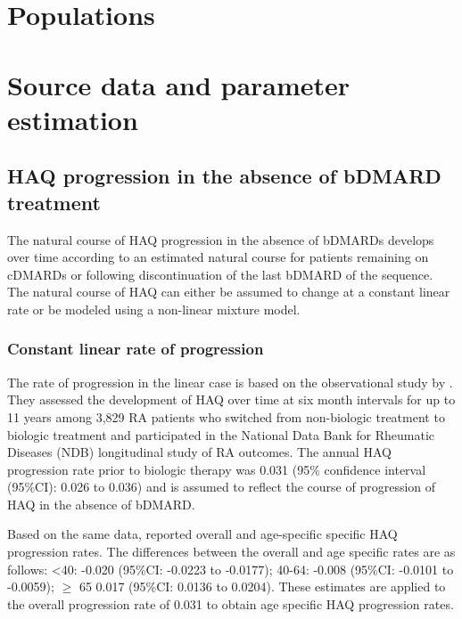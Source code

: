 \documentclass[11pt,final,fleqn]{article}\usepackage[]{graphicx}\usepackage[]{color}
\theoremstyle{plain}
\begin{document}
\section{Populations}\label{sec:populations}

\section{Source data and parameter estimation}\label{sec:data-parameters}

\subsection{HAQ progression in the absence of bDMARD
treatment}\label{haq-progression-in-the-absence-of-bdmard-treatment}

The natural course of HAQ progression in the absence of bDMARDs develops over time according to an estimated natural course for patients remaining on cDMARDs or following discontinuation of the last bDMARD of the sequence. The natural course of HAQ can either be assumed to change at a constant linear rate or be modeled using a non-linear mixture model. 

\subsubsection{Constant linear rate of progression} \label{sec:haq-linear-rate}
The rate of progression in the linear case is based on the observational study by \citet{wolfe2010loss}. They assessed the development of HAQ over time at six month intervals for up to 11 years among 3,829 RA patients who switched from non-biologic treatment to biologic treatment and participated in the National Data Bank for Rheumatic Diseases (NDB) longitudinal study of RA outcomes. The annual HAQ progression rate prior to biologic therapy was 0.031 (95\% confidence interval (95\%CI): 0.026 to 0.036) and is assumed to reflect the course of progression of HAQ in the absence of bDMARD.

Based on the same data, \citet{michaud2011treatment} reported overall and age-specific specific HAQ progression rates. The differences between the overall and age specific rates are as follows: \textless{}40: -0.020 (95\%CI: -0.0223 to -0.0177); 40-64: -0.008 (95\%CI: -0.0101 to -0.0059); \(\geq\) 65 0.017 (95\%CI: 0.0136 to 0.0204). These estimates are applied to the overall progression rate of 0.031 to obtain age specific HAQ progression rates.
\end{document}

